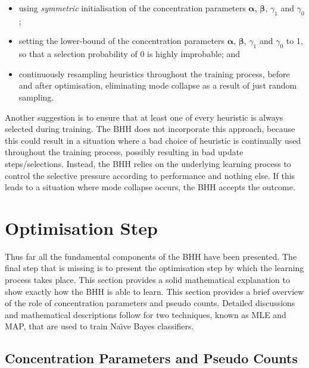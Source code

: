 \begin{itemize}
      \item using \textit{symmetric} initialisation of the concentration parameters $\boldsymbol{\alpha}$, $\boldsymbol{\beta}$, $\gamma_{1}$ and $\gamma_{0}$;

      \item setting the lower-bound of the concentration parameters $\boldsymbol{\alpha}$, $\boldsymbol{\beta}$, $\gamma_{1}$ and $\gamma_{0}$ to 1, so that a selection probability of 0 is highly improbable; and

      \item continuously resampling heuristics throughout the training process, before and after optimisation, eliminating mode collapse as a result of just random sampling.
\end{itemize}

Another suggestion is to ensure that at least one of every heuristic is always selected during training. The \acs{BHH} does not incorporate this approach, because this could result in a situation where a bad choice of heuristic is continually used throughout the training process, possibly resulting in bad update steps/selections. Instead, the \acs{BHH} relies on the underlying learning process to control the selective pressure according to performance and nothing else. If this leads to a situation where mode collapse occurs, the \acs{BHH} accepts the outcome.

\section{Optimisation Step}\label{sec:bhh:optimisation_step}

Thus far all the fundamental components of the \acs{BHH} have been presented. The final step that is missing is to present the optimisation step by which the learning process takes place. This section provides a solid mathematical explanation to show exactly how the \acs{BHH} is able to learn. This section provides a brief overview of the role of concentration parameters and pseudo counts. Detailed discussions and mathematical descriptions follow for two techniques, known as \acs{MLE} and \acs{MAP}, that are used to train Na\"{\i}ve Bayes classifiers.

\subsection{Concentration Parameters and Pseudo Counts}\label{sec:bhh:optimisation_step:concentration_pseudo_counts}

